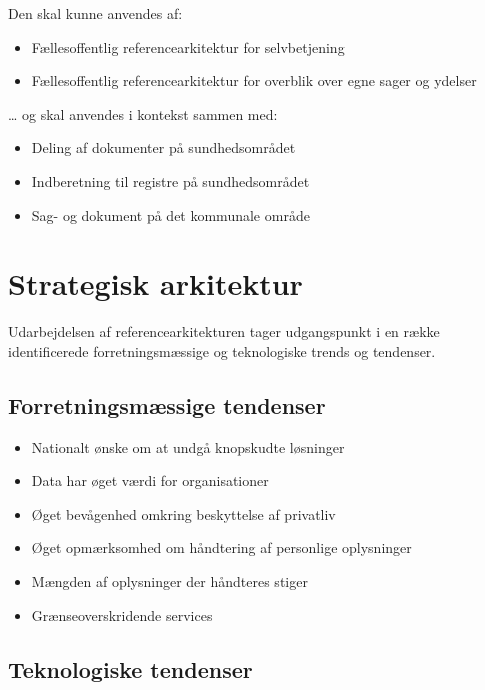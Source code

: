 Den skal kunne anvendes af:

\begin{itemize}
\tightlist
\item
  Fællesoffentlig referencearkitektur for selvbetjening
\item
  Fællesoffentlig referencearkitektur for overblik over egne sager og
  ydelser
\end{itemize}

\ldots{} og skal anvendes i kontekst sammen med:

\begin{itemize}
\tightlist
\item
  Deling af dokumenter på sundhedsområdet
\item
  Indberetning til registre på sundhedsområdet
\item
  Sag- og dokument på det kommunale område
\end{itemize}

\section{Strategisk arkitektur}\label{strategisk-arkitektur}

Udarbejdelsen af referencearkitekturen tager udgangspunkt i en række
identificerede forretningsmæssige og teknologiske trends og tendenser.

\subsection{Forretningsmæssige
tendenser}\label{forretningsmuxe6ssige-tendenser}

\begin{itemize}
\tightlist
\item
  Nationalt ønske om at undgå knopskudte løsninger
\item
  Data har øget værdi for organisationer
\item
  Øget bevågenhed omkring beskyttelse af privatliv
\item
  Øget opmærksomhed om håndtering af personlige oplysninger
\item
  Mængden af oplysninger der håndteres stiger
\item
  Grænseoverskridende services
\end{itemize}

\subsection{Teknologiske tendenser}\label{teknologiske-tendenser}

